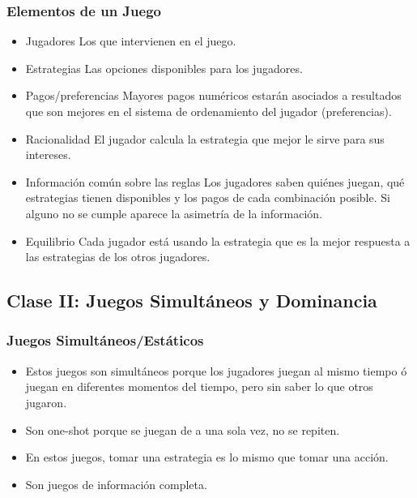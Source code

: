 \documentclass{article}
\begin{document}
            \subsubsection*{Elementos de un Juego}
                \begin{itemize}
                    \item Jugadores
                        \subitem Los que intervienen en el juego.
                    \item Estrategias
                        \subitem Las opciones disponibles para los jugadores.
                    \item Pagos/preferencias
                        \subitem Mayores pagos numéricos estarán asociados a resultados que son mejores en el sistema de ordenamiento del jugador (preferencias).
                    \item Racionalidad
                        \subitem El jugador calcula la estrategia que mejor le sirve para sus intereses.
                    \item Información común sobre las reglas
                        \subitem Los jugadores saben quiénes juegan, qué estrategias tienen disponibles y los pagos de cada combinación posible. Si alguno no se cumple aparece la asimetría de la información.
                    \item Equilibrio
                        \subitem Cada jugador está usando la estrategia que es la mejor respuesta a las estrategias de los otros jugadores.
                \end{itemize}
        \subsection*{Clase II: Juegos Simultáneos y Dominancia}
            \subsubsection*{Juegos Simultáneos/Estáticos}
                \begin{itemize}
                    \item Estos juegos son simultáneos porque los jugadores juegan al mismo tiempo ó juegan en diferentes momentos del tiempo, pero sin saber lo que otros jugaron.
                    \item Son one-shot porque se juegan de a una sola vez, no se repiten.
                    \item En estos juegos, tomar una estrategia es lo mismo que tomar una acción.
                    \item Son juegos de información completa.
                \end{itemize}
\end{document}
